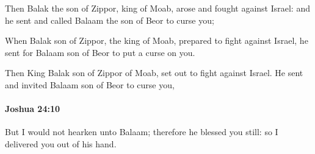 			\begin{versebox}
					\item[BHS] 
					\item[ASV] Then Balak the son of Zippor, king of Moab, arose and fought against Israel: and he sent and called Balaam the son of Beor to curse you;
					\item[NIV] When Balak son of Zippor, the king of Moab, prepared to fight against Israel, he sent for Balaam son of Beor to put a curse on you.
					\item[NRSV] Then King Balak son of Zippor of Moab, set out to fight against Israel. He sent and invited Balaam son of Beor to curse you,
			\end{versebox}

		\paragraph{Joshua 24:10} %
			\label{JOSHUA-24-10}

			But I would not hearken unto Balaam; therefore he blessed you still: so I delivered you out of his hand.

